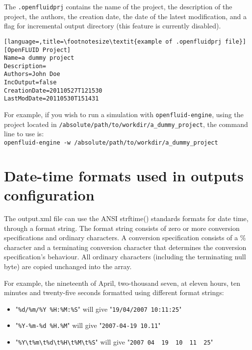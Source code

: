 The \texttt{.openfluidprj} contains the name of the project, the description of the project, the authors,
the creation date, the date of the latest modification, and a flag for
incremental output directory (this feature is currently disabled). 

\begin{lstlisting}[language=,title=\footnotesize\textit{example of .openfluidprj file}]
[OpenFLUID Project]
Name=a dummy project
Description=
Authors=John Doe
IncOutput=false
CreationDate=20110527T121530
LastModDate=20110530T151431
\end{lstlisting}

\medskip

For example, if you wish to run a simulation with \texttt{openfluid-engine}, using the project located in
\texttt{/absolute/path/to/workdir/a\_dummy\_project}, the command line to use is:\\
\texttt{openfluid-engine -w /absolute/path/to/workdir/a\_dummy\_project}\\

\medskip


\section{Date-time formats used in outputs configuration}

The output.xml file can use the ANSI strftime() standards formats for date time, through a format string. 
The format string consists of zero or more conversion specifications and ordinary characters.
A conversion specification consists of a \% character and a terminating conversion character that determines the conversion specification's behaviour.
All ordinary characters (including the terminating null byte) are copied unchanged into the array.

\bigskip

For example, the nineteenth of April, two-thousand seven, at eleven hours, ten minutes and twenty-five seconds formatted using different format strings:
\begin{itemize}
\item "\verb|%d/%m/%Y %H:%M:%S|" will give "\verb|19/04/2007 10:11:25|"
\item "\verb|%Y-%m-%d %H.%M|" will give "\verb|2007-04-19 10.11|"
\item "\verb|%Y\t%m\t%d\t%H\t%M\t%S|" will give "\verb|2007	04	19	10	11	25|"
\end{itemize}

